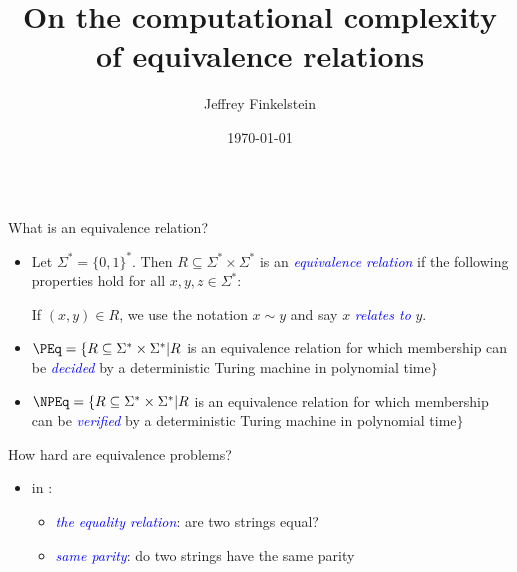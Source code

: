 \documentclass[final]{beamer}
\title{On the computational complexity of equivalence relations}
\author{Jeffrey Finkelstein}
\institute{Tufts University}
\date{\today}
\newcommand{\emphblue}[1]{\emph{\textcolor{blue}{#1}}}
\newcommand{\sigmastar}{\Sigma^*}
\begin{document}
\begin{frame}{}
  \begin{columns}[t]

    \begin{column}{.3\linewidth}

      \begin{block}{\LARGE What is an equivalence relation?}
        \Large
        \begin{itemize}
        \item Let $\sigmastar=\{0,1\}^*$. Then
          $R\subseteq\sigmastar\times\sigmastar$ is an \emphblue{equivalence
          relation} if the following properties hold for all
          $x,y,z\in\sigmastar$:
          If $(x,y)\in R$, we use the notation $x\sim y$ and say $x$
          \emphblue{relates to} $y$.
        \item $\PEq=\{R\subseteq\sigmastar\times\sigmastar|R$ is an equivalence
          relation for which membership can be \emphblue{decided} by a
          deterministic Turing machine in polynomial time$\}$
        \item $\NPEq=\{R\subseteq\sigmastar\times\sigmastar|R$ is an
          equivalence relation for which membership can be \emphblue{verified}
          by a deterministic Turing machine in polynomial time$\}$
        \end{itemize}
      \end{block}
      \vspace{2in}
      \begin{block}{\LARGE How hard are equivalence problems?}
        \Large
        \begin{itemize}
          \setlength{\itemsep}{20pt}
        \item in \PEq:
          \begin{itemize}\Large
          \item \emphblue{the equality relation}: are two strings equal?
          \item \emphblue{same parity}: do two strings have the same parity

\end{itemize}
\end{itemize}
\end{block}
\end{column}
\end{columns}
\end{frame}
\end{document}
